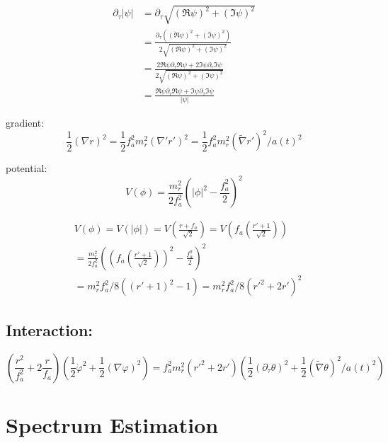 \documentclass[a4paper]{article}
\begin{document}
\begin{align}
    \partial_\tau |\psi| &= \partial_\tau \sqrt{ (\Re \psi)^2 + (\Im \psi)^2 } \\
                         &= \frac{ \partial_\tau ((\Re \psi)^2 + (\Im \psi)^2) }{ 2 \sqrt{ (\Re \psi)^2 + (\Im \psi)^2 } } \\
                         &= \frac{ 2 \Re \psi \partial_\tau \Re \psi + 2 \Im \psi \partial_\tau \Im \psi }{ 2 \sqrt{ (\Re \psi)^2 + (\Im \psi)^2 } } \\
                         &= \frac{ \Re \psi \partial_\tau \Re \psi + \Im \psi \partial_\tau \Im \psi }{ |\psi| }
\end{align}

gradient:
\begin{equation}
    \frac{1}{2} (\nabla r)^2 = \frac{1}{2} f_a^2 m_r^2 ( \nabla' r')^2
    = \frac{1}{2} f_a^2 m_r^2 ( \tilde{\nabla} r')^2 / a(t)^2
\end{equation}

potential:
\begin{equation}
    V(\phi) = \frac{m_r^2}{2 f_a^2}\left( |\phi|^2 - \frac{f_a^2}{2} \right)^2
\end{equation}

\begin{align}
    &V(\phi) = V(|\phi|) = V(\frac{r + f_a}{\sqrt{2}})
    = V \left(f_a \left( \frac{r' + 1}{\sqrt{2}} \right) \right) \\
    &= \frac{m_r^2}{2 f_a^2}\left( \left(f_a \left( \frac{r' + 1}{\sqrt{2}} \right) \right)^2 - \frac{f_a^2}{2} \right)^2 \\
    &= m_r^2 f_a^2 / 8 ( (r' + 1)^2 - 1)
    = m_r^2 f_a^2 / 8 ( r'^2 + 2 r' )^2
\end{align}

\subsection{Interaction:}
\begin{equation}
\left( \frac{r^2}{f_a^2} + 2 \frac{r}{f_a} \right) \left( \frac{1}{2} \dot{\varphi}^2 + \frac{1}{2} (\nabla \varphi)^2 \right)
= f_a^2 m_r^2 (r'^2 + 2 r') \left( \frac{1}{2} (\partial_\tau \theta )^2 + \frac{1}{2} (\tilde{\nabla} \theta)^2 / a(t)^2 \right)
\end{equation}

\newpage
\section{Spectrum Estimation}
\end{document}
